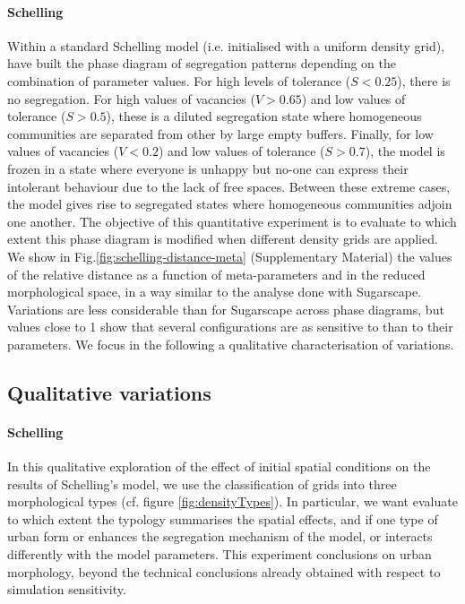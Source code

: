 \documentclass[3p,times,procedia]{elsarticle}
\begin{document}
\paragraph{Schelling} 
Within a standard Schelling model (i.e. initialised with a uniform density grid), \citet{Gauvinetal2009} have built the phase diagram of segregation patterns depending on the combination of parameter values. For high levels of tolerance ($S < 0.25$), there is no segregation. For high values of vacancies ($V > 0.65$) and low values of tolerance ($S > 0.5$), these is a diluted segregation state where homogeneous communities are separated from other by large empty buffers. Finally, for low values of vacancies ($V < 0.2$) and low values of tolerance ($S > 0.7$), the model is frozen in a state where everyone is unhappy but no-one can express their intolerant behaviour due to the lack of free spaces. Between these extreme cases, the model gives rise to segregated states where homogeneous communities adjoin one another. The objective of this quantitative experiment is to evaluate to which extent this phase diagram is modified when different density grids are applied. We show in Fig.\ref{fig:schelling-distance-meta} (Supplementary Material) the values of the relative distance as a function of meta-parameters and in the reduced morphological space, in a way similar to the analyse done with Sugarscape. Variations are less considerable than for Sugarscape across phase diagrams, but values close to 1 show that several configurations are as  sensitive to  than to their parameters. We  focus in the following  a qualitative characterisation of  variations.

\subsection{Qualitative variations}
\label{sec:qualResults}

\paragraph{Schelling} In this qualitative exploration of the effect of initial spatial conditions on the results of Schelling's model, we use the classification of grids into three morphological types (cf. figure \ref{fig:densityTypes}). In particular, we want  evaluate to which extent the typology summarises the spatial effects, and  if one type of urban form or  enhances the segregation mechanism of the model, or interacts differently with the model parameters. This experiment  conclusions on urban morphology, beyond the technical conclusions already obtained with respect to simulation sensitivity.
\end{document}
